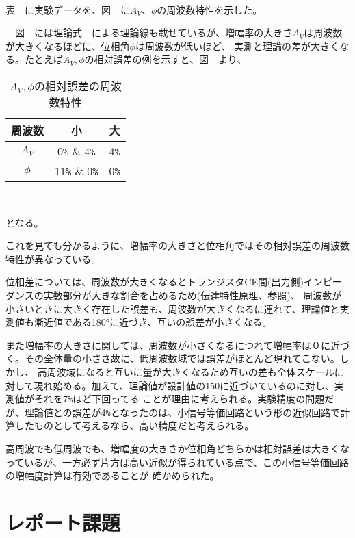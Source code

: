 \documentclass[11pt,a4j,titlepage]{jsarticle}
\begin{document}
　\clearpage

  表\ \ に実験データを、図\ \ に$A_V$、$\phi$の周波数特性を示した。

　図\ \ には理論式\ \ による理論線も載せているが、増幅率の大きさ$A_V$は周波数が大きくなるほどに、位相角$\phi$は周波数が低いほど、
 実測と理論の差が大きくなる。たとえば$A_V,\phi$の相対誤差の例を示すと、図\ \ より、

 \begin{table}[htb]
  \begin{center}
    \caption{$A_V,\phi$の相対誤差の周波数特性}
    \begin{tabular}{|c|c|c|} \hline
周波数 & 小 & 大 \\ \hline
$A_V$ & 0\verb|%| & 4\verb|%| \\ \hline
$\phi$ & 11\verb|%| & 0\verb|%| \\ \hline
    \end{tabular}
    \label{tab:price}
  \end{center}
　\end{table}
  
  となる。
  
  これを見ても分かるように、増幅率の大きさと位相角ではその相対誤差の周波数特性が異なっている。
  
  位相差については、周波数が大きくなるとトランジスタCE間(出力側)インピーダンスの実数部分が大きな割合を占めるため(伝達特性原理、参照)、
  周波数が小さいときに大きく存在した誤差も、周波数が大きくなるに連れて、理論値と実測値も漸近値である180°に近づき、互いの誤差が小さくなる。
  
  また増幅率の大きさに関しては、周波数が小さくなるにつれて増幅率は０に近づく。その全体量の小ささ故に、低周波数域では誤差がほとんど現れてこない。しかし、
  高周波域になると互いに量が大きくなるため互いの差も全体スケールに対して現れ始める。加えて、理論値が設計値の150に近づいているのに対し、実測値がそれを7\verb|%|ほど下回ってる
  ことが理由に考えられる。実験精度の問題だが、理論値との誤差が4\verb|%|となったのは、小信号等価回路という形の近似回路で計算したものとして考えるなら、高い精度だと考えられる。
  
  高周波でも低周波でも、増幅度の大きさか位相角どちらかは相対誤差は大きくなっているが、一方必ず片方は高い近似が得られている点で、この小信号等価回路の増幅度計算は有効であることが
  確かめられた。
   
   \clearpage
  
 \section{レポート課題}
\end{document}
